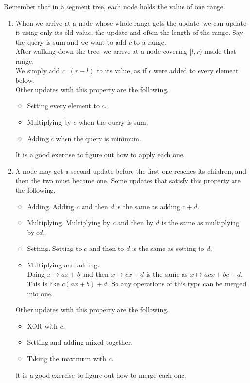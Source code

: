 \begin{notes}
Remember that in a segment tree, each node holds the value of one range.
\begin{enumerate}[label=\textup{(U\arabic*)},leftmargin=*]
\item When we arrive at a node whose whole range gets the update, we can update it using only its old value, the update and often the length of the range. Say the query is sum and we want to add \(c\) to a range. \\
After walking down the tree, we arrive at a node covering \([l, r)\) inside that range. \\
We simply add \(c \cdot (r - l)\) to its value, as if \(c\) were added to every element below. \\
Other updates with this property are the following.
\begin{itemize}
\item Setting every element to \(c\).
\item Multiplying by \(c\) when the query is sum.
\item Adding \(c\) when the query is minimum.
\end{itemize}
It is a good exercise to figure out how to apply each one.
\item A node may get a second update before the first one reaches its children, and then the two must become one. Some updates that satisfy this property are the following.
\begin{itemize}
\item Adding. Adding \(c\) and then \(d\) is the same as adding \(c + d\).
\item Multiplying. Multiplying by \(c\) and then by \(d\) is the same as multiplying by \(cd\).
\item Setting. Setting to \(c\) and then to \(d\) is the same as setting to \(d\).
\item Multiplying and adding. \\
Doing \(x \mapsto ax + b\) and then \(x \mapsto cx + d\) is the same as \(x \mapsto acx + bc + d\). \\
This is like \(c(ax + b) + d\). So any operations of this type can be merged into one.
\end{itemize}
Other updates with this property are the following.
\begin{itemize}
\item XOR with \(c\).
\item Setting and adding mixed together.
\item Taking the maximum with \(c\).
\end{itemize}
It is a good exercise to figure out how to merge each one.
\end{enumerate}
\end{notes}

